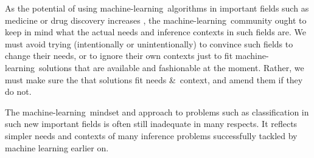 \documentclass[\ifafour a4paper,12pt,\else a5paper,10pt,\fi%
onecolumn,oneside,article,%
british%
]{memoir}
\theoremstyle{remark}
\theoremstyle{innote}
\newcommand*{\amp}{\&}
\renewcommand*{\|}[1][]{\nonscript\:#1\vert\nonscript\:\mathopen{}}
\newcommand*{\ml}{machine-learning}
\begin{document}
As the potential of using \ml\ algorithms in important fields such as medicine or drug discovery increases \autocites{lundervoldetal2019,chenetal2018,green2019}, the \ml\ community ought to keep in mind what the actual needs and inference contexts in such fields are. We must avoid trying (intentionally or unintentionally) to convince such fields to change their needs, or to ignore their own contexts just to fit \ml\ solutions that are available and fashionable at the moment. Rather, we must make sure the that solutions fit needs \amp\ context, and amend them if they do not.

The \ml\ mindset and approach to problems such as classification in such new important fields is often still inadequate in many respects. It reflects simpler needs and contexts of many  inference problems successfully tackled by machine learning earlier on.
\end{document}
